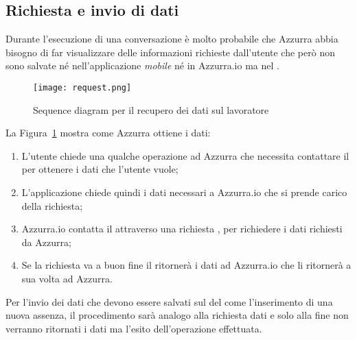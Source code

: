 \subsection{Richiesta e invio di dati}
Durante l'esecuzione di una conversazione è molto probabile che Azzurra abbia bisogno di far visualizzare delle informazioni richieste dall'utente che però non sono salvate né nell'applicazione \emph{mobile} né in Azzurra.io ma nel .
\begin{figure}[h]
	\begin{center}
		\texttt{[image: request.png]}
		\caption{Sequence diagram per il recupero dei dati sul lavoratore}\label{fig:request}
	\end{center}
\end{figure}
La Figura~\ref{fig:request} mostra come Azzurra ottiene i dati:
\begin{enumerate}
	\item L'utente chiede una qualche operazione ad Azzurra che necessita contattare il  per ottenere i dati che l'utente vuole;
	\item L'applicazione chiede quindi i dati necessari a Azzurra.io che si prende carico della richiesta;
	\item Azzurra.io contatta il  attraverso una richiesta , per richiedere i dati richiesti da Azzurra;
	\item Se la richiesta va a buon fine il  ritornerà i dati ad Azzurra.io che li ritornerà a sua volta ad Azzurra.
\end{enumerate}
Per l'invio dei dati che devono essere salvati sul  del  come l'inserimento di una nuova assenza, il procedimento sarà analogo alla richiesta dati e solo alla fine non verranno ritornati i dati ma l'esito dell'operazione effettuata. 
